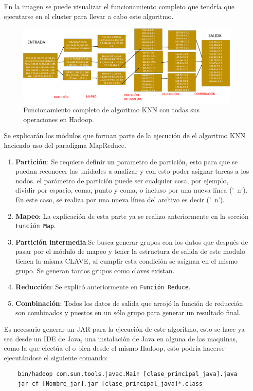 En la imagen  se puede visualizar el funcionamiento completo que tendría que ejecutarse en el cluster para llevar a cabo este algoritmo.
	\begin{figure}[H]
		\begin{center}
			\hypertarget{fig:fuknn}{\hspace{1pt}}
			\includegraphics[width=.9\textwidth]{capitulo4a/images/ImagenKNN.png}
			\caption{Funcionamiento completo de algoritmo KNN con todas sus operaciones en Hadoop.}
			\label{fig:fuknn}
		\end{center}
	\end{figure}
Se explicarán los módulos que forman parte de la ejecución de el algoritmo KNN haciendo uso del paradigma MapReduce.
\begin{enumerate}
	\item \textbf{Partición}: Se requiere definir un parametro de partición, esto para que se puedan reconocer las unidades a analizar y con esto poder asignar tareas a los nodos. el parámetro de partición puede ser cualquier cosa, por ejemplo, dividir por espacio, coma, punto y coma, o incluso por una nueva línea ('\ n').
	En este caso, se realiza por una nueva línea del archivo es decir ('\ n').
	\item \textbf{Mapeo}: La explicación de esta parte ya se realizo anteriormente en la sección  
	 \texttt{Función Map}.
	\item \textbf{Partición intermedia}:Se busca generar grupos con los datos que después de pasar por el módulo de mapeo y tener la estructura de salida de este modulo tienen la misma CLAVE, al cumplir esta condición se asignan en el mismo grupo. Se generan tantos grupos como claves existan.
	\item \textbf{Reducción}: Se explicó anteriormente en  \texttt{Función Reduce}. 
	\item \textbf{Combinación}: Todos los datos de salida que arrojó la función de reducción son combinados y puestos en un sólo grupo para generar un resultado final.
\end{enumerate}		
Es necesario generar un JAR para la ejecución de este algoritmo, esto se hace ya sea desde un IDE de Java, una instalación de Java en alguna de las maquinas, como la que efectúa el  o bien desde el mismo Hadoop, esto podría hacerse ejecutándose el siguiente comando:
 \begin{verbatim}
 	bin/hadoop com.sun.tools.javac.Main [clase_principal_java].java
 	jar cf [Nombre_jar].jar [clase_principal_java]*.class
 \end{verbatim}

